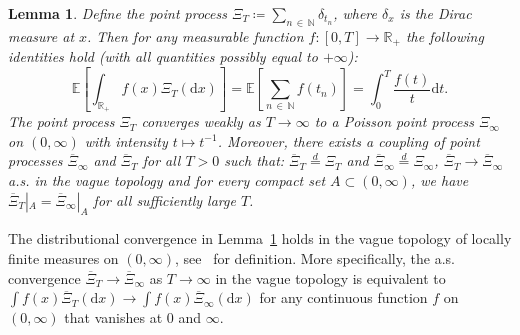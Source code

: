 \documentclass[10pt]{amsart}
\newtheorem{lemm}[theo]{Lemma}\newtheorem{prop}[theo]{Proposition}\newtheorem{coro}[theo]{Corollary}\newtheorem{conj}[theo]{Conjecture}
\theoremstyle{definition}\newtheorem{defi}[theo]{Definition}\newtheorem{rema}[theo]{Remark}\newtheorem{exam}[theo]{Example}\newtheorem{exem}[theo]{Example}\newtheorem{nota}[theo]{Notation}
\newcommand\N{\mathbb{N}}
\newcommand\R{\mathbb{R}}
\newcommand\E{\mathds{E}}
\newcommand\1{\mathds{1}}
\newcommand\D{\mathrm{d}}
\newcommand\eqd{\overset{d}{=}}
\newcommand\ov[1]{\overline{#1}}
\begin{document}
\begin{lemm}\label{lem:SB_weak_conv}
Define the point process $\Xi_T\coloneqq \sum_{n\,\in\,\N}\delta_{t_n}$, where $\delta_x$ is the Dirac measure at $x$. Then for any measurable function $f:[0,T]\to\R_+$ the following identities hold (with all quantities possibly equal to $+\infty$):
\begin{equation}\label{eq:SB_nnt}
\E\left[\int_{\R_+} f(x)\Xi_T(\D x)\right] =\E\left[\sum_{n\,\in\,\N}f(t_n)\right] =\int_0^T \frac{f(t)}{t}\D t.
\end{equation}
The point process $\Xi_T$ converges weakly as $T\to\infty$ to a Poisson point process $\Xi_\infty$ on $(0,\infty)$ with intensity $t\mapsto t^{-1}$. Moreover, there exists a coupling of point processes $\ov\Xi_\infty$ and $\ov\Xi_T$ for all $T>0$ such that: $\ov\Xi_T\eqd\Xi_T$ and $\ov\Xi_\infty\eqd\Xi_\infty$, $\ov\Xi_T\to\ov\Xi_\infty$ a.s. in the vague topology and for every compact set $A\subset(0,\infty)$, we have $\ov\Xi_T|_A=\ov\Xi_\infty|_A$ for all sufficiently large $T$.
\end{lemm}

The distributional convergence in Lemma~\ref{lem:SB_weak_conv} holds in the vague topology of locally finite measures on $(0,\infty)$, see~\cite[Chapter~16, p.~316]{MR1876169} for definition. More specifically, the a.s. convergence $\ov\Xi_T\to\ov\Xi_\infty$ as $T\to\infty$ in the vague topology is equivalent to $\int f(x)\ov\Xi_T(\D x)\to\int f(x)\ov\Xi_\infty(\D x)$ for any continuous function $f$ on $(0,\infty)$ that vanishes at $0$ and $\infty$.
\end{document}
